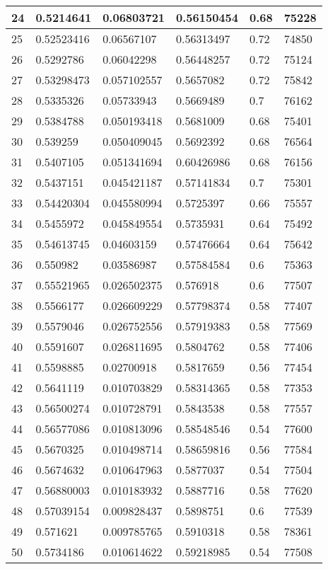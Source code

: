 \begin{longtable}{|l|l|l|l|l|l|}
24 & 0.5214641 & 0.06803721 & 0.56150454 & 0.68 & 75228 \\ \hline 
25 & 0.52523416 & 0.06567107 & 0.56313497 & 0.72 & 74850 \\ \hline 
26 & 0.5292786 & 0.06042298 & 0.56448257 & 0.72 & 75124 \\ \hline 
27 & 0.53298473 & 0.057102557 & 0.5657082 & 0.72 & 75842 \\ \hline 
28 & 0.5335326 & 0.05733943 & 0.5669489 & 0.7 & 76162 \\ \hline 
29 & 0.5384788 & 0.050193418 & 0.5681009 & 0.68 & 75401 \\ \hline 
30 & 0.539259 & 0.050409045 & 0.5692392 & 0.68 & 76564 \\ \hline 
31 & 0.5407105 & 0.051341694 & 0.60426986 & 0.68 & 76156 \\ \hline 
32 & 0.5437151 & 0.045421187 & 0.57141834 & 0.7 & 75301 \\ \hline 
33 & 0.54420304 & 0.045580994 & 0.5725397 & 0.66 & 75557 \\ \hline 
34 & 0.5455972 & 0.045849554 & 0.5735931 & 0.64 & 75492 \\ \hline 
35 & 0.54613745 & 0.04603159 & 0.57476664 & 0.64 & 75642 \\ \hline 
36 & 0.550982 & 0.03586987 & 0.57584584 & 0.6 & 75363 \\ \hline 
37 & 0.55521965 & 0.026502375 & 0.576918 & 0.6 & 77507 \\ \hline 
38 & 0.5566177 & 0.026609229 & 0.57798374 & 0.58 & 77407 \\ \hline 
39 & 0.5579046 & 0.026752556 & 0.57919383 & 0.58 & 77569 \\ \hline 
40 & 0.5591607 & 0.026811695 & 0.5804762 & 0.58 & 77406 \\ \hline 
41 & 0.5598885 & 0.02700918 & 0.5817659 & 0.56 & 77454 \\ \hline 
42 & 0.5641119 & 0.010703829 & 0.58314365 & 0.58 & 77353 \\ \hline 
43 & 0.56500274 & 0.010728791 & 0.5843538 & 0.58 & 77557 \\ \hline 
44 & 0.56577086 & 0.010813096 & 0.58548546 & 0.54 & 77600 \\ \hline 
45 & 0.5670325 & 0.010498714 & 0.58659816 & 0.56 & 77584 \\ \hline 
46 & 0.5674632 & 0.010647963 & 0.5877037 & 0.54 & 77504 \\ \hline 
47 & 0.56880003 & 0.010183932 & 0.5887716 & 0.58 & 77620 \\ \hline 
48 & 0.57039154 & 0.009828437 & 0.5898751 & 0.6 & 77539 \\ \hline 
49 & 0.571621 & 0.009785765 & 0.5910318 & 0.58 & 78361 \\ \hline 
50 & 0.5734186 & 0.010614622 & 0.59218985 & 0.54 & 77508 \\ \hline 
\end{longtable}